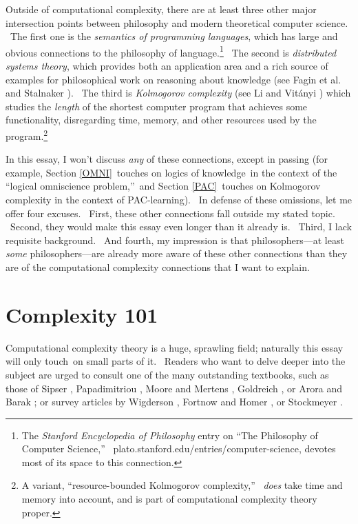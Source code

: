 \documentclass[11pt,onecolumn]{article}%
\begin{document}
Outside of computational complexity, there are at least three other major
intersection points between philosophy and modern theoretical computer
science. \ The first one is the \textit{semantics of programming languages},
which has large and obvious connections to the philosophy of
language.\footnote{The \textit{Stanford Encyclopedia of Philosophy} entry on
\textquotedblleft The Philosophy of Computer Science,\textquotedblright%
\ plato.stanford.edu/entries/computer-science, devotes most of its space to
this connection.} \ The second is \textit{distributed systems theory}, which
provides both an application area and a rich source of examples for
philosophical work on reasoning about knowledge (see Fagin et al.\ \cite{fhmv}
and Stalnaker \cite{stalnaker}). \ The third is \textit{Kolmogorov complexity}
(see Li and Vit\'{a}nyi \cite{livitanyi}) which studies the \textit{length} of
the shortest computer program that achieves some functionality, disregarding
time, memory, and other resources used by the program.\footnote{A variant,
\textquotedblleft resource-bounded Kolmogorov complexity,\textquotedblright%
\ \textit{does} take time and memory into account, and is part of
computational complexity theory proper.}

In this essay, I won't discuss \textit{any} of these connections, except in
passing (for example, Section \ref{OMNI}\ touches on logics of knowledge\ in
the context of the \textquotedblleft logical omniscience
problem,\textquotedblright\ and Section \ref{PAC}\ touches on Kolmogorov
complexity in the context of PAC-learning). \ In defense of these omissions,
let me offer four excuses. \ First, these other connections fall outside my
stated topic. \ Second, they would make this essay even longer than it already
is. \ Third, I lack requisite background. \ And fourth, my impression is that
philosophers---at least \textit{some} philosophers---are already more aware of
these other connections than they are of the computational complexity
connections that I want to explain.

\section{Complexity 101\label{C101}}

Computational complexity theory is a huge, sprawling field; naturally this
essay will only touch\ on small parts of it. \ Readers who want to delve
deeper into the subject are urged to consult one of the many outstanding
textbooks, such as those of Sipser \cite{sipser:book}, Papadimitriou
\cite{papa:book}, Moore and Mertens \cite{mooremertens}, Goldreich
\cite{goldreich:book}, or Arora and Barak \cite{arorabarak}; or survey
articles by Wigderson \cite{wigderson:survey1,wigderson:survey2}, Fortnow and
Homer \cite{fortnowhomer}, or Stockmeyer \cite{stockmeyer:survey}.
\end{document}
